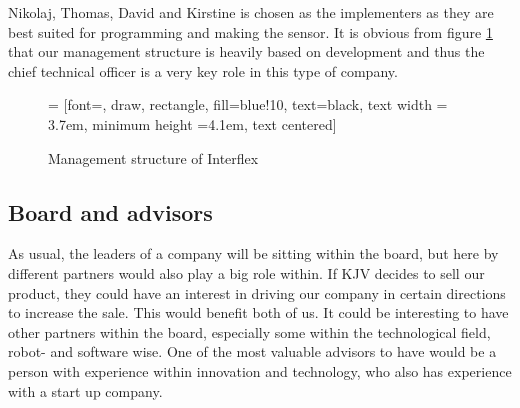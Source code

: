 Nikolaj, Thomas, David and Kirstine is chosen as the implementers as they are best suited for programming and making the sensor.
It is obvious from figure \ref{management_structure} that our management structure is heavily based on development and thus the chief technical officer is a very key role in this type of company.

\begin{figure}[ht]
\centering
     = [font=\footnotesize, draw, rectangle, fill=blue!10, text=black, text width = 3.7em, minimum height =4.1em, text centered]
  \caption{Management structure of Interflex}
  \label{management_structure}
\end{figure}


\subsection{Board and advisors}
As usual, the leaders of a company will be sitting within the board, but here by different partners would also play a big role within. If KJV decides to sell our product, they could have an interest in driving our company in certain directions to increase the sale. This would benefit both of us. 
It could be interesting to have other partners within the board, especially some within the technological field, robot- and software wise.
One of the most valuable advisors to have would be a person with experience within innovation and technology, who also has experience with a start up company. 
